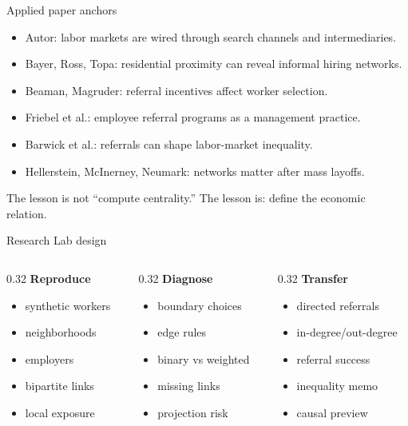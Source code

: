 \documentclass[aspectratio=169,11pt]{beamer}
\newcommand{\1}{\mathbf{1}}
\begin{document}
\begin{frame}{Applied paper anchors}
\begin{itemize}
    \item Autor: labor markets are wired through search channels and intermediaries.
    \item Bayer, Ross, Topa: residential proximity can reveal informal hiring networks.
    \item Beaman, Magruder: referral incentives affect worker selection.
    \item Friebel et al.: employee referral programs as a management practice.
    \item Barwick et al.: referrals can shape labor-market inequality.
    \item Hellerstein, McInerney, Neumark: networks matter after mass layoffs.
\end{itemize}

\medskip
The lesson is not ``compute centrality.'' The lesson is: define the economic relation.
\end{frame}

\begin{frame}{Research Lab design}
\begin{columns}[T,onlytextwidth]
\begin{column}{0.32\linewidth}
\textbf{Reproduce}
\begin{itemize}
    \item synthetic workers
    \item neighborhoods
    \item employers
    \item bipartite links
    \item local exposure
\end{itemize}
\end{column}
\begin{column}{0.32\linewidth}
\textbf{Diagnose}
\begin{itemize}
    \item boundary choices
    \item edge rules
    \item binary vs weighted
    \item missing links
    \item projection risk
\end{itemize}
\end{column}
\begin{column}{0.32\linewidth}
\textbf{Transfer}
\begin{itemize}
    \item directed referrals
    \item in-degree/out-degree
    \item referral success
    \item inequality memo
    \item causal preview
\end{itemize}
\end{column}
\end{columns}
\end{frame}
\end{document}
